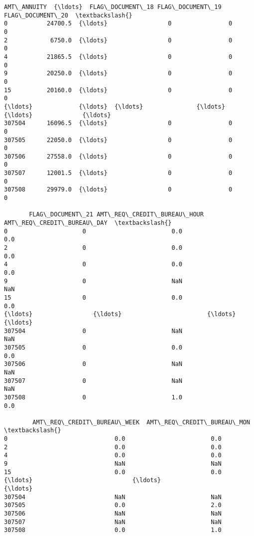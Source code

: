 \documentclass[11pt]{article}
\begin{document}
\begin{tcolorbox}[breakable, size=fbox, boxrule=.5pt, pad at break*=1mm, opacityfill=0]
\begin{Verbatim}[commandchars=\\\{\}]
        AMT\_ANNUITY  {\ldots}  FLAG\_DOCUMENT\_18 FLAG\_DOCUMENT\_19 FLAG\_DOCUMENT\_20  \textbackslash{}
0           24700.5  {\ldots}                 0                0                0
2            6750.0  {\ldots}                 0                0                0
4           21865.5  {\ldots}                 0                0                0
9           20250.0  {\ldots}                 0                0                0
15          20160.0  {\ldots}                 0                0                0
{\ldots}             {\ldots}  {\ldots}               {\ldots}              {\ldots}              {\ldots}
307504      16096.5  {\ldots}                 0                0                0
307505      22050.0  {\ldots}                 0                0                0
307506      27558.0  {\ldots}                 0                0                0
307507      12001.5  {\ldots}                 0                0                0
307508      29979.0  {\ldots}                 0                0                0

       FLAG\_DOCUMENT\_21 AMT\_REQ\_CREDIT\_BUREAU\_HOUR AMT\_REQ\_CREDIT\_BUREAU\_DAY  \textbackslash{}
0                     0                        0.0                       0.0
2                     0                        0.0                       0.0
4                     0                        0.0                       0.0
9                     0                        NaN                       NaN
15                    0                        0.0                       0.0
{\ldots}                 {\ldots}                        {\ldots}                       {\ldots}
307504                0                        NaN                       NaN
307505                0                        0.0                       0.0
307506                0                        NaN                       NaN
307507                0                        NaN                       NaN
307508                0                        1.0                       0.0

        AMT\_REQ\_CREDIT\_BUREAU\_WEEK  AMT\_REQ\_CREDIT\_BUREAU\_MON  \textbackslash{}
0                              0.0                        0.0
2                              0.0                        0.0
4                              0.0                        0.0
9                              NaN                        NaN
15                             0.0                        0.0
{\ldots}                            {\ldots}                        {\ldots}
307504                         NaN                        NaN
307505                         0.0                        2.0
307506                         NaN                        NaN
307507                         NaN                        NaN
307508                         0.0                        1.0


\end{Verbatim}
\end{tcolorbox}
\end{document}
